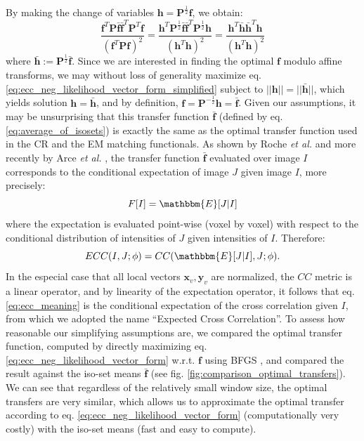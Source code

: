 By making the change of variables $\mathbf{h} = \mathbf{P}^{\frac{1}{2}}\mathbf{f}$, we obtain:
\begin{equation}\label{eq:ecc_neg_likelihood_vector_form_simplified}
    \frac{\mathbf{f}^{T}\mathbf{P}\mathbf{\bar{f}}\mathbf{\bar{f}}^{T}\mathbf{P}^{T}\mathbf{f}}{\left(\mathbf{f}^{T} \mathbf{P} \mathbf{f}\right)^{2}} =
    \frac{\mathbf{h}^{T}\mathbf{P}^{\frac{1}{2}}\mathbf{\bar{f}}\mathbf{\bar{f}}^{T}\mathbf{P}^{\frac{1}{2}}\mathbf{h}} {\left(\mathbf{h}^{T}\mathbf{h}\right)^{2}} =
    \frac{\mathbf{h}^{T}\mathbf{\bar{h}}\mathbf{\bar{h}}^{T}\mathbf{h}} {\left(\mathbf{h}^{T}\mathbf{h}\right)^{2}}
\end{equation}
where $\mathbf{\bar{h}} := \mathbf{P}^{\frac{1}{2}}\mathbf{\bar{f}}$. Since we are interested in finding the optimal $\mathbf{f}$ modulo affine transforms, we may without loss of generality maximize eq. \eqref{eq:ecc_neg_likelihood_vector_form_simplified} subject to $||\mathbf{h}|| = ||\mathbf{\bar{h}}||$, which yields solution $\mathbf{h} = \mathbf{\bar{h}}$, and by definition, $\mathbf{f} = \mathbf{P}^{-\frac{1}{2}}\mathbf{h} = \mathbf{\bar{f}}$. Given our assumptions, it may be unsurprising that this transfer function $\mathbf{\bar{f}}$ (defined by eq. \eqref{eq:average_of_isosets}) is exactly the same as the optimal transfer function used in the CR and the EM matching functionals. As shown by Roche {\it et al.} \citep{Roche1998, Roche2000} and more recently by Arce {\it et al.} \cite{Arce-santana2014}, the transfer function $\mathbf{\bar{f}}$ evaluated over image $I$ corresponds to the conditional expectation of image $J$ given image $I$, more precisely:
\begin{displaymath}
    F[I] = \mathbbm{E}[J | I]
\end{displaymath}
where the expectation is evaluated point-wise (voxel by voxel) with respect to the conditional distribution of intensities of $J$ given intensities of $I$. Therefore:
\begin{equation}\label{eq:ecc_meaning}
    ECC(I, J; \phi) = CC(\mathbbm{E}[J|I], J ; \phi).
\end{equation}
In the especial case that all local vectors $\mathbf{x}_{v}, \mathbf{y}_{v}$ are normalized, the $CC$ metric is a linear operator, and by linearity of the expectation operator, it follows that eq. \eqref{eq:ecc_meaning} is the conditional expectation of the cross correlation given $I$, from which we adopted the name ``Expected Cross Correlation''. To assess how reasonable our simplifying assumptions are, we compared the optimal transfer function, computed by directly maximizing eq. \eqref{eq:ecc_neg_likelihood_vector_form} w.r.t. $\mathbf{f}$ using BFGS \citep{GVK502988711}, and compared the result against the iso-set means $\mathbf{\bar{f}}$ (see fig. \ref{fig:comparison_optimal_transfers}). We can see that regardless of the relatively small window size, the optimal transfers are very similar, which allows us to approximate the optimal transfer according to eq. \eqref{eq:ecc_neg_likelihood_vector_form} (computationally very costly) with the iso-set means (fast and easy to compute).\\


